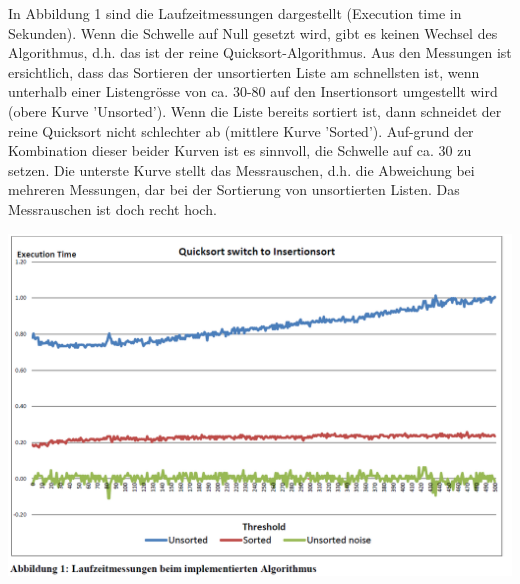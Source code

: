 In Abbildung 1 sind die Laufzeitmessungen dargestellt (Execution time in Sekunden). Wenn die Schwelle auf Null gesetzt wird, gibt es keinen Wechsel des Algorithmus, d.h. das ist der reine Quicksort-Algorithmus. Aus den Messungen ist ersichtlich, dass das Sortieren der unsortierten Liste am schnellsten ist, wenn unterhalb einer Listengrösse von ca. 30-80 auf den Insertionsort umgestellt wird (obere Kurve 'Unsorted'). Wenn die Liste bereits sortiert ist, dann schneidet der reine Quicksort nicht schlechter ab (mittlere Kurve 'Sorted'). Auf-grund der Kombination dieser beider Kurven ist es sinnvoll, die Schwelle auf ca. 30 zu setzen.
Die unterste Kurve stellt das Messrauschen, d.h. die Abweichung bei mehreren Messungen, dar bei der Sortierung von unsortierten Listen. Das Messrauschen ist doch recht hoch.

\includegraphics[width=.8\linewidth]{900-Praktika/prak03/pic.PNG}



\noindent\makebox[\linewidth]{\rule{\paperwidth}{0.4pt}}

\noindent\makebox[\linewidth]{\rule{\paperwidth}{0.4pt}}

\noindent\makebox[\linewidth]{\rule{\paperwidth}{0.4pt}}

\noindent\makebox[\linewidth]{\rule{\paperwidth}{0.4pt}}

\noindent\makebox[\linewidth]{\rule{\paperwidth}{0.4pt}}
